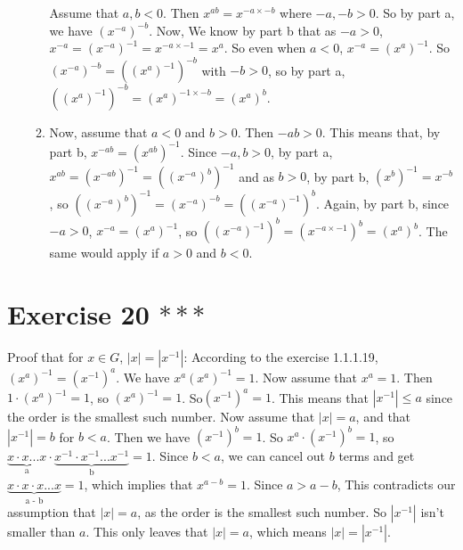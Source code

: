 \documentclass{article}
\begin{document}
\begin{enumerate}[label=\textbf{\alph*.}]
\begin{enumerate}[label=\textbf{case \arabic*:}]
                    Assume that $a, b < 0$.
                    Then $x^{ab} = x^{-a \times -b}$
                    where $-a, -b > 0$.
                    So by part a, we have $(x^{-a})^{-b}$.
                    Now, We know by part b that as $-a > 0$, $x^{-a}
                    = (x^{-a})^{-1} = x^{-a \times -1}
                    = x^{a}$.
                    So even when $a < 0$, $x^{-a} = (x^{a})^{-1}$. 
                    So $(x^{-a})^{-b} = ((x^{a})^{-1})^{-b}$ with $-b > 0$,
                    so by part a, $((x^{a})^{-1})^{-b}
                    = (x^{a})^{-1 \times -b}
                    = (x^{a})^{b}$.
                \item
                    Now, assume that $a < 0$ and $b > 0$.
                    Then $-ab > 0$.
                    This means that, by part b, $x^{-ab} = (x^{ab})^{-1}$.
                    Since $-a, b > 0$, by part a, $x^{ab}
                    = (x^{-ab})^{-1}
                    = ((x^{-a})^{b})^{-1}$
                    and as $b > 0$, by part b, $(x^{b})^{-1} = x^{-b}$,
                    so $((x^{-a})^{b})^{-1}
                    = (x^{-a})^{-b}
                    = ((x^{-a})^{-1})^{b}$.
                    Again, by part b, since $-a > 0$, $x^{-a} = (x^{a})^{-1}$,
                    so $((x^{-a})^{-1})^{b}
                    = (x^{-a \times -1})^{b}
                    = (x^{a})^{b}$.
                    The same would apply if $a > 0$ and $b < 0$.
                \end{enumerate}
    \end{enumerate}


    \section*{Exercise 20 $***$}
    Proof that for $x \in G$, $|x| = |x^{-1}|$:
    According to the exercise 1.1.1.19, $(x^{a})^{-1} = (x^{-1})^{a}$.
    We have $x^{a}(x^{a})^{-1} = 1$.
    Now assume that $x^a = 1$.
    Then $1 \cdot (x^{a})^{-1} = 1$, so $(x^{a})^{-1} = 1$.
    So$(x^{-1})^{a} = 1$.
    This means that $|x^{-1}| \leqslant a$
    since the order is the smallest such number.
    Now assume that $|x| = a$, and that $|x^{-1}| = b$ for $b < a$.
    Then we have $(x^{-1})^{b} = 1$.
    So $x^{a} \cdot (x^{-1})^{b} = 1$,
    so $\underbrace{x \cdot x ... x}_\text{a} \cdot
    \underbrace{x^{-1} \cdot x^{-1} ... x^{-1}}_\text{b} = 1$.
    Since $b < a$, we can cancel out $b$ terms and get
    $\underbrace{x \cdot x \cdot x ... x}_\text{a - b} = 1$,
    which implies that $x^{a-b} = 1$.
    Since $a > a - b$, This contradicts our assumption that $|x| = a$,
    as the order is the smallest such number.
    So $|x^{-1}|$ isn't smaller than $a$.
    This only leaves that $|x| = a$,
    which means $|x| = |x^{-1}|$.
\end{document}
